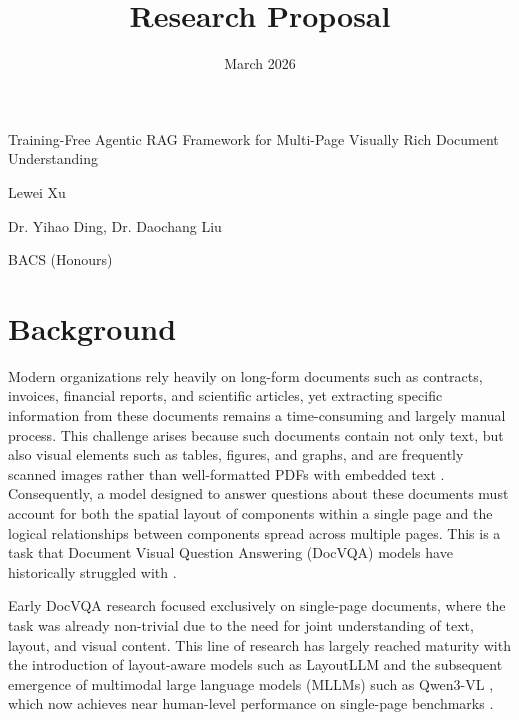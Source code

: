 \documentclass[12pt, a4paper]{article}
\title{Research Proposal}
\date{March 2026}
\newcommand{\namelistlabel}[1]{\mbox{#1}\hfil}
\newenvironment{namelist}[1]{%
\begin{list}{}
    {
        \let\makelabel\namelistlabel
        \settowidth{\labelwidth}{#1}
        \setlength{\leftmargin}{1.1\labelwidth}
    }
  }{%
\end{list}}
\begin{document}
\maketitle

\begin{namelist}{xxxxxxxxxxxx}
\item[{\bf Title:}]
	Training-Free Agentic RAG Framework for Multi-Page Visually Rich Document Understanding
\item[{\bf Author:}]
	Lewei Xu
\item[{\bf Supervisor:}]
	Dr. Yihao Ding, Dr. Daochang Liu
\item[{\bf Degree:}]
	BACS (Honours)
\end{namelist}

\section*{Background}


Modern organizations rely heavily on long-form documents such as contracts, invoices, financial reports, and scientific articles, yet extracting specific information from these documents remains a time-consuming and largely manual process. This challenge arises because such documents contain not only text, but also visual elements such as tables, figures, and graphs, and are frequently scanned images rather than well-formatted PDFs with embedded text \cite{DocExtractNet}. Consequently, a model designed to answer questions about these documents must account for both the spatial layout of components within a single page and the logical relationships between components spread across multiple pages. This is a task that Document Visual Question Answering (DocVQA) models have historically struggled with \cite{DocVQA}.

Early DocVQA research focused exclusively on single-page documents, where the task was already non-trivial due to the need for joint understanding of text, layout, and visual content. This line of research has largely reached maturity with the introduction of layout-aware models such as LayoutLLM \cite{LayoutLLM} and the subsequent emergence of multimodal large language models (MLLMs) such as Qwen3-VL \cite{Qwen3-VL}, which now achieves near human-level performance on single-page benchmarks \cite{rrcsingle}.
\end{document}
